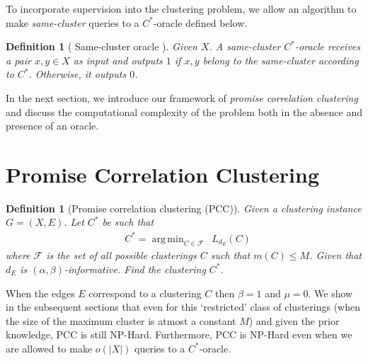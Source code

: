 \documentclass[12pt]{article}
\newtheorem{definition}[theorem]{Definition}
\newcommand{\mc}{\mathcal}
\DeclareMathOperator*{\argmin}{arg\,min}
\begin{document}
To incorporate supervision into the clustering problem, we allow an algorithm to make \textit{same-cluster} queries to a $C^*$-oracle defined below.
\begin{definition}[ Same-cluster oracle \cite{ashtiani2016clustering}]
Given $X$. A same-cluster $C^*$-oracle receives a pair $x, y \in X$ as input and outputs $1$ if $x, y$ belong to the same-cluster according to $C^*$. Otherwise, it outputs $0$. 
\end{definition}

In the next section, we introduce our framework of \textit{promise correlation clustering} and discuss the computational complexity of the problem both in the absence and presence of an oracle.   

\section{Promise Correlation Clustering}
\label{section:PCC}

\begin{definition}[Promise correlation clustering (PCC)]
\label{defn:promiseCorrClustering}
Given a clustering instance $G = (X, E)$. Let $C^*$ be such that
\begin{align}
  &C^* = \argmin_{C \in \mc F} \enspace L_{d_E}(C) \label{eqn:promiseCorrLoss}
\end{align}
where $\mc F$ is the set of all possible clusterings $C$ such that $m(C) \le M$. Given that $d_E$ is $(\alpha, \beta)$-informative. Find the clustering $C^*$. 
\end{definition}
When the edges $E$ correspond to a clustering $C$ then $\beta = 1$ and $\mu = 0$. We show in the subsequent sections that even for this `restricted' class of clusterings (when the size of the maximum cluster is atmost a constant $M$) and given the prior knowledge, PCC is still NP-Hard. Furthermore, PCC is NP-Hard even when we are allowed to make $o(|X|)$ queries to a $C^*$-oracle. 
\end{document}
